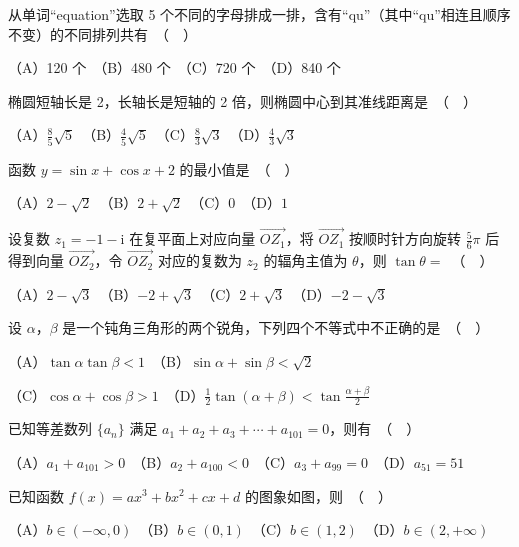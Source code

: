 \begin{question}
从单词“equation”选取 5 个不同的字母排成一排，含有“qu”（其中“qu”相连且顺序不变）的不同排列共有　（　）

（A）120 个　（B）480 个　（C）720 个　（D）840 个

\end{question}
\begin{question}
椭圆短轴长是 2，长轴长是短轴的 2 倍，则椭圆中心到其准线距离是　（　）

（A）$\frac{8}{5}\sqrt{5}$　（B）$\frac{4}{5}\sqrt{5}$　（C）$\frac{8}{3}\sqrt{3}$　（D）$\frac{4}{3}\sqrt{3}$

\end{question}
\begin{question}
函数 $y = \sin x + \cos x + 2$ 的最小值是　（　）

（A）$2 - \sqrt{2}$　（B）$2 + \sqrt{2}$　（C）$0$　（D）$1$

\end{question}
\begin{question}
设复数 $z_1 = -1 - \mathrm{i}$ 在复平面上对应向量 $\overrightarrow{OZ_1}$，将 $\overrightarrow{OZ_1}$ 按顺时针方向旋转 $\frac{5}{6}\pi$ 后得到向量 $\overrightarrow{OZ_2}$，令 $\overrightarrow{OZ_2}$ 对应的复数为 $z_2$ 的辐角主值为 $\theta$，则 $\tan\theta =$　（　）

（A）$2 - \sqrt{3}$　（B）$-2 + \sqrt{3}$　（C）$2 + \sqrt{3}$　（D）$-2 - \sqrt{3}$

\end{question}
\begin{question}
设 $\alpha$，$\beta$ 是一个钝角三角形的两个锐角，下列四个不等式中不正确的是　（　）

（A）$\tan\alpha \tan\beta < 1$　（B）$\sin\alpha + \sin\beta < \sqrt{2}$

（C）$\cos\alpha + \cos\beta > 1$　（D）$\frac{1}{2}\tan(\alpha+\beta) < \tan\frac{\alpha+\beta}{2}$

\end{question}
\begin{question}
已知等差数列 $\{a_n\}$ 满足 $a_1 + a_2 + a_3 + \cdots + a_{101} = 0$，则有　（　）

（A）$a_1 + a_{101} > 0$　（B）$a_2 + a_{100} < 0$　（C）$a_3 + a_{99} = 0$　（D）$a_{51} = 51$

\Needspace{0.4\textheight}
\end{question}
\begin{question}
已知函数 $f(x) = ax^3 + bx^2 + cx + d$ 的图象如图，则　（　）
\nopagebreak[4]
\begin{center}\end{center}
\nopagebreak[4]
（A）$b \in (-\infty, 0)$　（B）$b \in (0, 1)$　（C）$b \in (1, 2)$　（D）$b \in (2, +\infty)$

\end{question}

